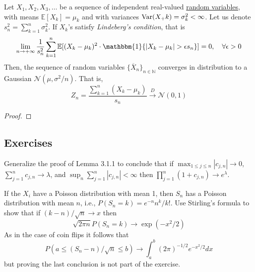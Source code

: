 	\begin{theorem}
		Let $X_1, X_2, X_3, \ldots$ be a sequence of independent real-valued \hyperref[def:random-variable]{random variables}, with means $\mathbb{E}[X_k] = \mu_k$ and with variances $\operatorname{Var}(X_+k) = \sigma_k^2 < \infty$. Let us denote $s_n^2 = \sum_{k=1}^n \sigma_k^2$. If $X_k$'s satisfy \textit{Lindeberg's condition}, that is 
		\begin{equation}
			\lim_{n \to +\infty} \frac{1}{s_n^2} \sum_{k=1}^n \mathbb{E}[(X_k - \mu_k)^2 \cdot \mathbbm{1}\{|X_k - \mu_k| > \epsilon s_n \}] = 0, \quad \forall \epsilon > 0
		\end{equation}
		Then, the sequence of random variables $\{\overline{X}_n\}_{n \in \mathbb{N}}$ converges in distribution to a Gaussian $\mathcal{N}(\mu, \sigma^2 / n)$. That is, 
    \begin{equation}
			Z_n = \frac{\sum_{k=1}^n (X_k - \mu_k)}{s_n} \xrightarrow{D} \mathcal{N}(0, 1)
    \end{equation}
	\end{theorem}
	\begin{proof}
	  
	\end{proof}

\subsection{Exercises} 

  \begin{exercise}[Durrett 3.1.1]
    Generalize the proof of Lemma 3.1.1 to conclude that if $\max_{1 \leq j \leq n} |c_{j,n}| \to 0$, $\sum_{j=1}^n c_{j,n} \to \lambda$, and $\sup_n \sum_{j=1}^n |c_{j,n}| < \infty$ then $\prod_{j=1}^n (1 + c_{j,n}) \to e^\lambda$.
  \end{exercise}
  \begin{solution}

  \end{solution}

  \begin{exercise}[Durrett 3.1.2]
    If the $X_i$ have a Poisson distribution with mean 1, then $S_n$ has a Poisson distribution with mean $n$, i.e., $P(S_n = k) = e^{-n}n^k/k!$. Use Stirling's formula to show that if $(k - n)/\sqrt{n} \to x$ then
    \begin{equation*}
      \sqrt{2\pi n}P(S_n = k) \to \exp(-x^2/2)
    \end{equation*}
    As in the case of coin flips it follows that
    \begin{equation*}
      P(a \leq (S_n - n)/\sqrt{n} \leq b) \to \int_a^b (2\pi)^{-1/2} e^{-x^2/2} dx
    \end{equation*}
    but proving the last conclusion is not part of the exercise.
  \end{exercise}
  \begin{solution}

  \end{solution}

